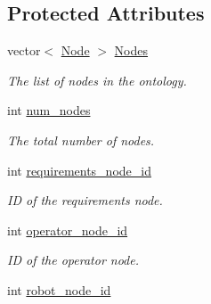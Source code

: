 \subsection*{\-Protected \-Attributes}
\begin{DoxyCompactItemize}
\item 
\hypertarget{classOntology_a8c979e0f169e8c791166c1b9317f57fe}{vector$<$ \hyperlink{classNode}{\-Node} $>$ \hyperlink{classOntology_a8c979e0f169e8c791166c1b9317f57fe}{\-Nodes}}\label{classOntology_a8c979e0f169e8c791166c1b9317f57fe}

\begin{DoxyCompactList}\small\item\em \-The list of nodes in the ontology. \end{DoxyCompactList}\item 
\hypertarget{classOntology_a1a07e715754eb483dd786e66c3a46168}{int \hyperlink{classOntology_a1a07e715754eb483dd786e66c3a46168}{num\-\_\-nodes}}\label{classOntology_a1a07e715754eb483dd786e66c3a46168}

\begin{DoxyCompactList}\small\item\em \-The total number of nodes. \end{DoxyCompactList}\item 
\hypertarget{classOntology_adbeb2879d35a50128368b9e2fa1f808a}{int \hyperlink{classOntology_adbeb2879d35a50128368b9e2fa1f808a}{requirements\-\_\-node\-\_\-id}}\label{classOntology_adbeb2879d35a50128368b9e2fa1f808a}

\begin{DoxyCompactList}\small\item\em \-I\-D of the requirements node. \end{DoxyCompactList}\item 
\hypertarget{classOntology_a9e3ff741a3feb41bf4b1e48efad367b0}{int \hyperlink{classOntology_a9e3ff741a3feb41bf4b1e48efad367b0}{operator\-\_\-node\-\_\-id}}\label{classOntology_a9e3ff741a3feb41bf4b1e48efad367b0}

\begin{DoxyCompactList}\small\item\em \-I\-D of the operator node. \end{DoxyCompactList}\item 
\hypertarget{classOntology_a0fcb8725935b37ae5f261c105f3396a1}{int \hyperlink{classOntology_a0fcb8725935b37ae5f261c105f3396a1}{robot\-\_\-node\-\_\-id}}\label{classOntology_a0fcb8725935b37ae5f261c105f3396a1}


\end{DoxyCompactItemize}
